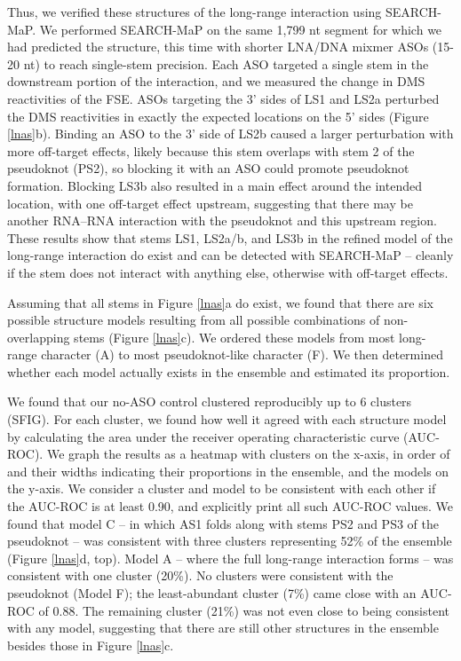 \documentclass[main.tex]{subfiles}
\begin{document}
Thus, we verified these structures of the long-range interaction using SEARCH-MaP.
We performed SEARCH-MaP on the same 1,799 nt segment for which we had predicted the structure, this time with shorter LNA/DNA mixmer ASOs (15-20 nt) to reach single-stem precision.
Each ASO targeted a single stem in the downstream portion of the interaction, and we measured the change in DMS reactivities of the FSE.
ASOs targeting the 3' sides of LS1 and LS2a perturbed the DMS reactivities in exactly the expected locations on the 5' sides (Figure \ref{lnas}b).
Binding an ASO to the 3' side of LS2b caused a larger perturbation with more off-target effects, likely because this stem overlaps with stem 2 of the pseudoknot (PS2), so blocking it with an ASO could promote pseudoknot formation.
Blocking LS3b also resulted in a main effect around the intended location, with one off-target effect upstream, suggesting that there may be another RNA--RNA interaction with the pseudoknot and this upstream region.
These results show that stems LS1, LS2a/b, and LS3b in the refined model of the long-range interaction do exist and can be detected with SEARCH-MaP -- cleanly if the stem does not interact with anything else, otherwise with off-target effects.

Assuming that all stems in Figure \ref{lnas}a do exist, we found that there are six possible structure models resulting from all possible combinations of non-overlapping stems (Figure \ref{lnas}c).
We ordered these models from most long-range character (A) to most pseudoknot-like character (F).
We then determined whether each model actually exists in the ensemble and estimated its proportion.

We found that our no-ASO control clustered reproducibly up to 6 clusters (SFIG).
For each cluster, we found how well it agreed with each structure model by calculating the area under the receiver operating characteristic curve (AUC-ROC).
We graph the results as a heatmap with clusters on the x-axis, in order of and their widths indicating their proportions in the ensemble, and the models on the y-axis.
We consider a cluster and model to be consistent with each other if the AUC-ROC is at least 0.90, and explicitly print all such AUC-ROC values.
We found that model C -- in which AS1 folds along with stems PS2 and PS3 of the pseudoknot -- was consistent with three clusters representing 52\% of the ensemble (Figure \ref{lnas}d, top).
Model A -- where the full long-range interaction forms -- was consistent with one cluster (20\%).
No clusters were consistent with the pseudoknot (Model F); the least-abundant cluster (7\%) came close with an AUC-ROC of 0.88.
The remaining cluster (21\%) was not even close to being consistent with any model, suggesting that there are still other structures in the ensemble besides those in Figure \ref{lnas}c.
\end{document}
